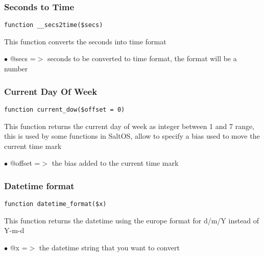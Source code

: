 \documentclass[a4paper]{article}
\begin{document}
\hypertarget{toc107}{}
\subsubsection{Seconds to Time}

\begin{lstlisting}
function __secs2time($secs)
\end{lstlisting}

This function converts the seconds into time format

\begin{compactitem}
\item[\color{myblue}$\bullet$] @secs =$>$ seconds to be converted to time format, the format will be a number
\end{compactitem}

\hypertarget{toc108}{}
\subsubsection{Current Day Of Week}

\begin{lstlisting}
function current_dow($offset = 0)
\end{lstlisting}

This function returns the current day of week as integer between 1 and 7
range, this is used by some functions in SaltOS, allow to specify a bias
used to move the current time mark

\begin{compactitem}
\item[\color{myblue}$\bullet$] @offset =$>$ the bias added to the current time mark
\end{compactitem}

\hypertarget{toc109}{}
\subsubsection{Datetime format}

\begin{lstlisting}
function datetime_format($x)
\end{lstlisting}

This function returns the datetime using the europe format for d/m/Y instead of Y-m-d

\begin{compactitem}
\item[\color{myblue}$\bullet$] @x =$>$ the datetime string that you want to convert
\end{compactitem}
\end{document}
